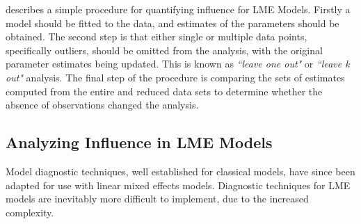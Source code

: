 \documentclass[12pt, a4paper]{report}
\theoremstyle{plain}
\theoremstyle{definition}
\theoremstyle{remark}
\begin{document}
\citet{schabenberger} describes a simple procedure for quantifying influence for LME Models. Firstly a model should be fitted to the data, and estimates of the parameters should be obtained. The second step is that either single or multiple data points, specifically outliers, should be omitted from the analysis, with the original parameter estimates being updated. This is known as \textit{``leave one out"} or \textit{``leave k out"} analysis. The final step of the procedure is comparing the sets of estimates computed from the entire and reduced data sets to determine whether the absence of observations changed the analysis. 







%

\subsection{Analyzing Influence in LME Models}

Model diagnostic techniques, well established for classical models, have since been adapted for use with linear mixed effects models. Diagnostic techniques for LME models are inevitably more difficult to implement, due to the increased complexity.
\end{document}
